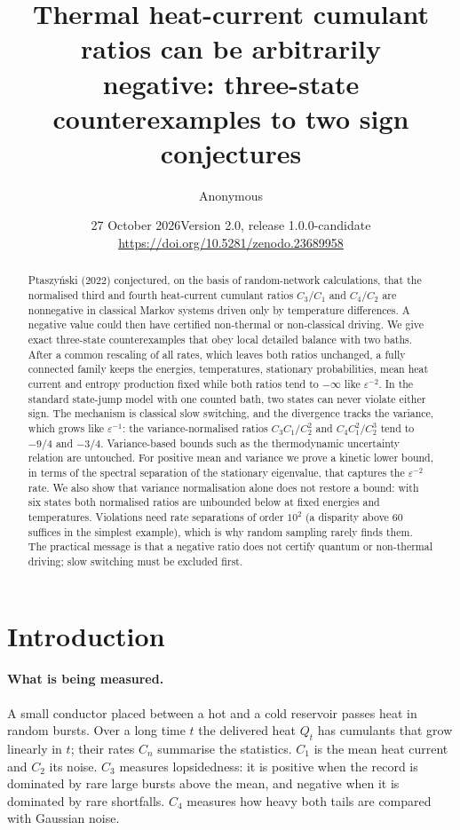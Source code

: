 \documentclass[11pt,a4paper]{article}
\title{\textcolor{ink}{Thermal heat-current cumulant ratios can be arbitrarily\\negative: three-state counterexamples to two sign conjectures}}
\author{Anonymous}
\date{27 October 2026\quad\textnormal{\small Version 2.0, release 1.0.0-candidate\\ \url{https://doi.org/10.5281/zenodo.23689958}}}
\theoremstyle{remark}\newtheorem{remark}[theorem]{Remark}
\newcommand{\eps}{\varepsilon}
\begin{document}
\maketitle
\begin{abstract}
Ptaszy\'nski (2022) conjectured, on the basis of random-network calculations, that the normalised third and fourth heat-current cumulant ratios $C_3/C_1$ and $C_4/C_2$ are nonnegative in classical Markov systems driven only by temperature differences. A negative value could then have certified non-thermal or non-classical driving. We give exact three-state counterexamples that obey local detailed balance with two baths. After a common rescaling of all rates, which leaves both ratios unchanged, a fully connected family keeps the energies, temperatures, stationary probabilities, mean heat current and entropy production fixed while both ratios tend to $-\infty$ like $\eps^{-2}$. In the standard state-jump model with one counted bath, two states can never violate either sign. The mechanism is classical slow switching, and the divergence tracks the variance, which grows like $\eps^{-1}$: the variance-normalised ratios $C_3C_1/C_2^2$ and $C_4C_1^2/C_2^3$ tend to $-9/4$ and $-3/4$. Variance-based bounds such as the thermodynamic uncertainty relation are untouched. For positive mean and variance we prove a kinetic lower bound, in terms of the spectral separation of the stationary eigenvalue, that captures the $\eps^{-2}$ rate. We also show that variance normalisation alone does not restore a bound: with six states both normalised ratios are unbounded below at fixed energies and temperatures. Violations need rate separations of order $10^2$ (a disparity above $60$ suffices in the simplest example), which is why random sampling rarely finds them. The practical message is that a negative ratio does not certify quantum or non-thermal driving; slow switching must be excluded first.
\end{abstract}

\section{Introduction}\label{sec:intro}
\paragraph{What is being measured.} A small conductor placed between a hot and a cold reservoir passes heat in random bursts. Over a long time $t$ the delivered heat $Q_t$ has cumulants that grow linearly in $t$; their rates $C_n$ summarise the statistics. $C_1$ is the mean heat current and $C_2$ its noise. $C_3$ measures lopsidedness: it is positive when the record is dominated by rare large bursts above the mean, and negative when it is dominated by rare shortfalls. $C_4$ measures how heavy both tails are compared with Gaussian noise.
\end{document}
